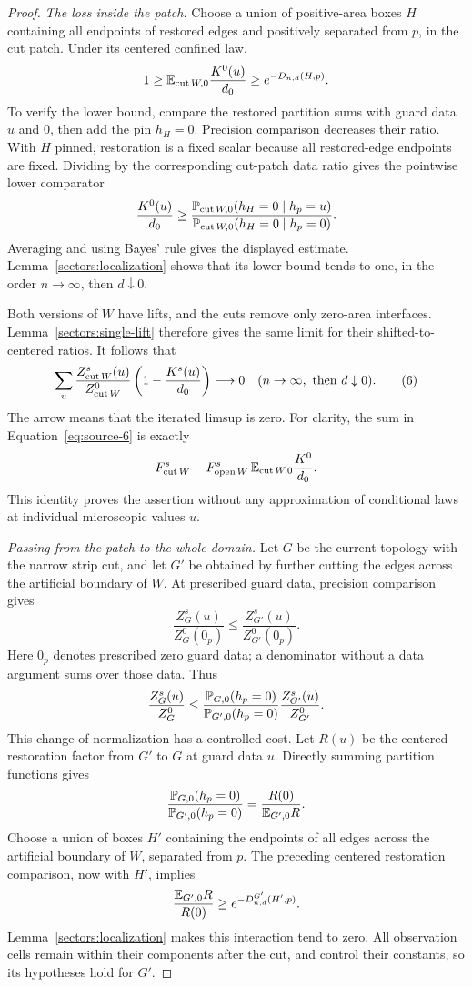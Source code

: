\begin{proof}
\emph{The loss inside the patch.}
Choose a union of positive-area boxes \(H\) containing all endpoints
of restored edges and positively separated from \(p\), in the cut
patch. Under its centered confined law,
\[
 1\ge \mathbb E_{{\rm cut}\,W,0}\frac{K^0(u)}{d_0}
 \ge e^{-D_{n,d}(H,p)}.
\]
To verify the lower bound, compare the restored partition sums with
guard data \(u\) and \(0\), then add the pin \(h_H=0\).
Precision comparison decreases their ratio. With \(H\) pinned,
restoration is a fixed scalar because all restored-edge endpoints
are fixed. Dividing by the corresponding cut-patch data ratio gives
the pointwise lower comparator
\[
 \frac{K^0(u)}{d_0}
 \ge
 \frac{\mathbb P_{{\rm cut}\,W,0}(h_H=0\mid h_p=u)}
      {\mathbb P_{{\rm cut}\,W,0}(h_H=0\mid h_p=0)}.
\]
Averaging and using Bayes' rule gives the displayed estimate.
Lemma~\ref{sectors:localization} shows that its lower bound tends
to one, in the order \(n\to\infty\), then \(d\downarrow0\).

Both versions of \(W\) have lifts, and the cuts remove only
zero-area interfaces. Lemma~\ref{sectors:single-lift} therefore
gives the same limit for their shifted-to-centered ratios.
It follows that
\begin{equation}
 \sum_u\frac{Z_{{\rm cut}\,W}^s(u)}{Z_{{\rm cut}\,W}^0}
           \left(1-\frac{K^s(u)}{d_0}\right)\longrightarrow0
 \quad(n\to\infty,\ \text{then }d\downarrow0).
 \tag{6}\label{eq:source-6}
\end{equation}
The arrow means that the iterated limsup is zero.
For clarity, the sum in Equation~\eqref{eq:source-6} is exactly
\[
 F_{{\rm cut}\,W}^s-
 F_{{\rm open}\,W}^s\,
       \mathbb E_{{\rm cut}\,W,0}\frac{K^0}{d_0}.
\]
This identity proves the assertion without any approximation of
conditional laws at individual microscopic values \(u\).

\emph{Passing from the patch to the whole domain.}
Let \(G\) be the current topology with the narrow strip cut, and
let \(G'\) be obtained by further cutting the edges across the
artificial boundary of \(W\). At prescribed guard data, precision
comparison gives
\[
 \frac{Z_G^s(u)}{Z_G^0(0_p)}
 \le \frac{Z_{G'}^s(u)}{Z_{G'}^0(0_p)}.
\]
Here \(0_p\) denotes prescribed zero guard data; a denominator without
a data argument sums over those data. Thus
\begin{equation}
 \frac{Z_G^s(u)}{Z_G^0}
 \le
 \frac{\mathbb P_{G,0}(h_p=0)}{\mathbb P_{G',0}(h_p=0)}
 \frac{Z_{G'}^s(u)}{Z_{G'}^0}.
 \label{sectors:global-data-bound}
\end{equation}
This change of normalization has a controlled cost.
Let \(R(u)\) be the centered restoration factor from \(G'\) to \(G\)
at guard data \(u\). Directly summing partition functions gives
\[
 \frac{\mathbb P_{G,0}(h_p=0)}{\mathbb P_{G',0}(h_p=0)}
 =\frac{R(0)}{\mathbb E_{G',0}R}.
\]
Choose a union of boxes \(H'\) containing the endpoints of all
edges across the artificial boundary of \(W\), separated from \(p\).
The preceding centered restoration comparison, now with \(H'\),
implies
\[
 \frac{\mathbb E_{G',0}R}{R(0)}
 \ge e^{-D_{n,d}^{G'}(H',p)}.
\]
Lemma~\ref{sectors:localization} makes this interaction tend to zero.
All observation cells remain within their components after the cut,
and control their constants, so its hypotheses hold for \(G'\).


\end{proof}
